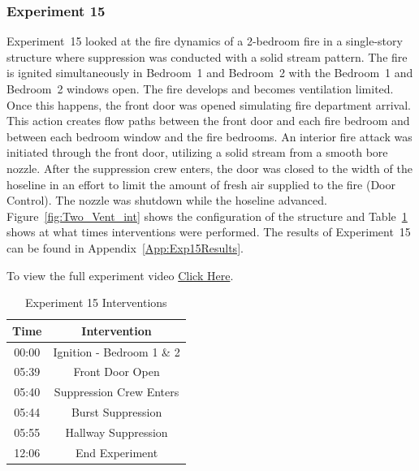\documentclass[12pt,oneside]{book}
\begin{document}
\subsubsection{Experiment 15}
Experiment~15 looked at the fire dynamics of a 2-bedroom fire in a single-story structure where suppression was conducted with a solid stream pattern. The fire is ignited simultaneously in Bedroom~1 and Bedroom~2 with the Bedroom~1 and Bedroom~2 windows open. The fire develops and becomes ventilation limited. Once this happens, the front door was opened simulating fire department arrival. This action creates flow paths between the front door and each fire bedroom and between each bedroom window and the fire bedrooms. An interior fire attack was initiated through the front door, utilizing a solid stream from a smooth bore nozzle. After the suppression crew enters, the door was closed to the width of the hoseline in an effort to limit the amount of fresh air supplied to the fire (Door Control). The nozzle was shutdown while the hoseline advanced. Figure~\ref{fig:Two_Vent_int} shows the configuration of the structure and Table~\ref{Table:Exp15Interventions} shows at what times interventions were performed. The results of Experiment~15 can be found in Appendix~\ref{App:Exp15Results}. 

To view the full experiment video \href{https://player.vimeo.com/video/170499619?autoplay=1}{Click Here}.

\begin{table}[H]
	\centering
	\caption{Experiment 15 Interventions}
	\begin{tabular}{|c|c|} 
		\hline
		Time & Intervention \\ \hline \hline
		00:00 & Ignition - Bedroom 1 \& 2 \\ \hline
		05:39 & Front Door Open \\ \hline
		05:40 & Suppression Crew Enters\\ \hline
		05:44 & Burst Suppression \\ \hline 
		05:55 & Hallway Suppression \\ \hline
		12:06 & End Experiment\\ \hline
	\end{tabular}
	\label{Table:Exp15Interventions}
\end{table}

\FloatBarrier
\end{document}
